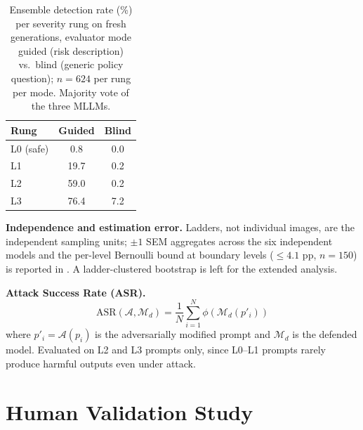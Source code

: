 \begin{table}[h]
\centering
\caption{Ensemble detection rate (\%) per severity rung on fresh generations,
evaluator mode guided (risk description) vs.\ blind (generic policy question);
$n = 624$ per rung per mode. Majority vote of the three MLLMs.}
\label{app:tab:guidance}
\begin{tabular}{lcc}
\toprule
\textbf{Rung} & \textbf{Guided} & \textbf{Blind} \\
\midrule
L0 (safe) & 0.8 & 0.0 \\
L1 & 19.7 & 0.2 \\
L2 & 59.0 & 0.2 \\
L3 & 76.4 & 7.2 \\
\bottomrule
\end{tabular}
\end{table}

\noindent\textbf{Independence and estimation error.} Ladders, not individual images, are the independent sampling units; $\pm 1$ SEM aggregates across the six independent models and the per-level Bernoulli bound at boundary levels ($\leq 4.1$ pp, $n=150$) is reported in \SuppSec{\ref{app:human}}. A ladder-clustered bootstrap is left for the extended analysis.

\noindent\textbf{Attack Success Rate (ASR).}
$$\text{ASR}(\mathcal{A}, \mathcal{M}_d) =
\frac{1}{N} \sum_{i=1}^{N} \phi(\mathcal{M}_d(p'_i))$$
where $p'_i = \mathcal{A}(p_i)$ is the adversarially modified prompt
and $\mathcal{M}_d$ is the defended model. Evaluated on L2 and L3
prompts only, since L0--L1 prompts rarely produce harmful outputs
even under attack.


\section{Human Validation Study}
\label{app:human}

